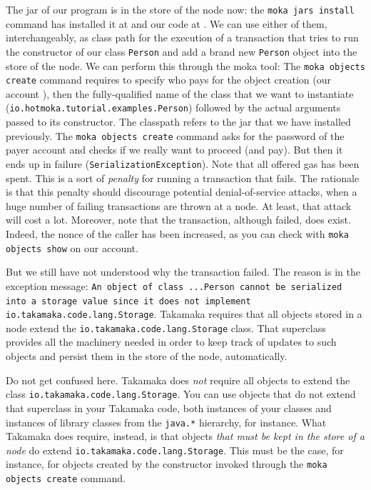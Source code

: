 The jar of our program is in the store of the node now: the \texttt{moka jars install} command
has installed it at \texttt{\familyAddressShort{}} and our code at
\texttt{\codeFamilyAddressShort{}}.
We can use either of them, interchangeably, as class path for the execution of a transaction that
tries to run the constructor of our class \texttt{Person} and add a brand
new \texttt{Person} object into the store of the node. We can perform this through the moka tool:
%
%
The \texttt{moka objects create}
command requires to specify who pays for the object creation
(our account \texttt{\accountOneShort{}}),
then the fully-qualified name of the class that we want to instantiate
(\texttt{io.hotmoka.tutorial.examples.Person})
followed by the actual arguments passed to its constructor.
The classpath refers to the jar that we have installed previously.
The \texttt{moka objects create} command
asks for the password of the payer account and
checks if we really want to proceed (and pay). But then it ends up in failure
(\texttt{SerializationException}). Note that all offered gas has been spent.
This is a sort of \emph{penalty} for running a transaction that fails.
The rationale is that this penalty should discourage
potential denial-of-service attacks, when a huge number of failing transactions are thrown at a
node. At least, that attack will cost a lot. Moreover, note that the transaction, although
failed, does exist. Indeed, the nonce of the caller has been increased, as you can check
with \texttt{moka objects show} on our account.

But we still have not understood why the transaction failed. The reason is in the exception
message: \texttt{An object of class ...Person cannot be serialized into a storage value since it does not implement io.takamaka.code.lang.Storage}.
Takamaka requires
that all objects stored in a node extend the \texttt{io.takamaka.code.lang.Storage} class.
That superclass
provides all the machinery needed in order to keep track of updates to such objects and persist
them in the store of the node, automatically.

\begin{commentbox}
Do not get confused here. Takamaka does \emph{not} require all objects to extend
the class \texttt{io.takamaka.code.lang.Storage}.
You can use objects that do not extend that superclass in your
Takamaka code, both instances of your classes and instances of library classes
from the \texttt{java.*} hierarchy, for instance.
What Takamaka does require, instead, is that objects
\emph{that must be kept in the store of a node} do extend
\texttt{io.takamaka.code.lang.Storage}. This
must be the case, for instance, for objects created by the constructor invoked through the
\texttt{moka objects create} command.
\end{commentbox}

